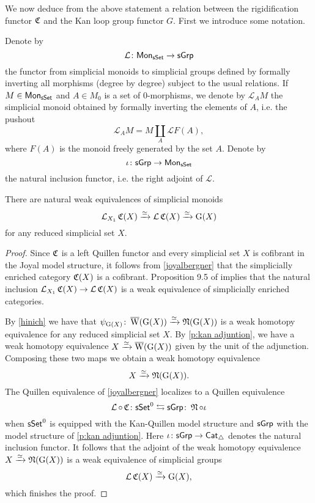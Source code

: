 We now deduce from the above statement a relation between the rigidification functor $\operatorname{\mathfrak{C}}$ and the Kan loop group functor $G$. First we introduce some notation. 

Denote by 
\[\mathcal{L} \colon \mathsf{Mon}_{\mathsf{sSet}} \to \mathsf{sGrp} \]
the functor from simplicial monoids to simplicial groups defined by formally inverting all morphisms (degree by degree) subject to the usual relations. If $M \in \mathsf{Mon}_{\mathsf{sSet}}$ and $A \in M_0$ is a set of $0$-morphisms, we denote by $\mathcal{L}_AM$ the simplicial monoid obtained by formally inverting the elements of $A$, i.e. the pushout
\[ \mathcal{L}_AM= M \coprod_A \mathcal{L}F(A), \]
where $F(A)$ is the monoid freely generated by the set $A$.
Denote by 
\[\iota \colon \mathsf{sGrp} \to \mathsf{Mon}_{\mathsf{sSet}} \] the natural inclusion functor, i.e. the right adjoint of $\mathcal{L}.$

\begin{lemma} \label{CandG}
	There are natural weak equivalences of simplicial monoids
	\begin{equation*}
	\operatorname{\mathcal{L}}_{X_1} \operatorname{\mathfrak{C}}(X) \xrightarrow{\simeq} \operatorname{\mathcal{L}}\operatorname{\mathfrak{C}}(X) \xrightarrow{\simeq} \operatorname{G}(X)
	\end{equation*}
	for any reduced simplicial set $X$.
\end{lemma}

\begin{proof}
	Since $\operatorname{\mathfrak{C}}$ is a left Quillen functor and every simplicial set $X$ is cofibrant in the Joyal model structure, it follows from \cref{joyalbergner} that the simplicially enriched category $\operatorname{\mathfrak{C}}(X)$ is a cofibrant.
	Proposition 9.5 of \cite{dwyer1980simplicial} implies that the natural inclusion $\operatorname{\mathcal{L}}_{X_1} \operatorname{\mathfrak{C}}(X) \to \operatorname{\mathcal{L}}\operatorname{\mathfrak{C}}(X)$ is a weak equivalence of simplicially enriched categories.
	
	By \cref{hinich} we have that $\psi_{\operatorname{G}(X)} \colon \operatorname{\overline{W}}(\operatorname{G}(X)) \xrightarrow{\simeq} \operatorname{\mathfrak{N}}(\operatorname{G}(X))$ is a weak homotopy equivalence for any reduced simplicial set $X$.
	By \cref{p:kan adjuntion}, we have a weak homotopy equivalence $X \xrightarrow{\simeq} \operatorname{\overline{W}}(\operatorname{G}(X))$ given by the unit of the adjunction.
	Composing these two maps we obtain a weak homotopy equivalence
	$$X \xrightarrow{\simeq} \operatorname{\mathfrak{N}}(\operatorname{G}(X)).$$
	The Quillen equivalence of \cref{joyalbergner} localizes to a Quillen equivalence
	$$\operatorname{\mathcal{L}} \circ \operatorname{\mathfrak{C}} \colon \mathsf{sSet}^0 \leftrightarrows \mathsf{sGrp} \colon \operatorname{\mathfrak{N}} \circ \iota$$
	when $\mathsf{sSet}^0$ is equipped with the Kan-Quillen model structure and $\mathsf{sGrp}$ with the model structure of \cref{p:kan adjuntion}.
	Here $\iota \colon \mathsf{sGrp} \to \mathsf{Cat}_{\triangle}$ denotes the natural inclusion functor.
	It follows that the adjoint of the weak homotopy equivalence $X \xrightarrow{\simeq} \operatorname{\mathfrak{N}}(\operatorname{G}(X))$ is a weak equivalence of simplicial groups
	$$\operatorname{\mathcal{L}}\operatorname{\mathfrak{C}}(X) \xrightarrow{\simeq} \operatorname{G}(X),$$
	which finishes the proof.
\end{proof}

